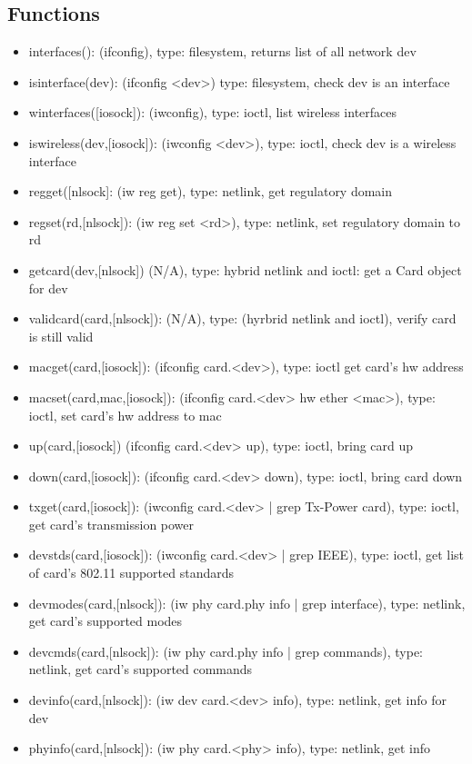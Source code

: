 \documentclass[11pt]{article}
\begin{document}
\begin{appendices}
\subsection{Functions}
\begin{itemize}
\item interfaces(): (ifconfig), type: filesystem, returns list of all network dev
\item isinterface(dev): (ifconfig <dev>) type: filesystem, check dev is an interface
\item winterfaces([iosock]): (iwconfig), type: ioctl, list wireless interfaces
\item iswireless(dev,[iosock]): (iwconfig <dev>), type: ioctl, check dev is a 
wireless interface
\item regget([nlsock]: (iw reg get), type: netlink, get regulatory domain
\item regset(rd,[nlsock]): (iw reg set <rd>), type: netlink, set regulatory domain 
to rd
\item getcard(dev,[nlsock]) (N/A), type: hybrid netlink and ioctl: get a Card 
object for dev
\item validcard(card,[nlsock]): (N/A), type: (hyrbrid netlink and ioctl), verify
card is still valid
\item macget(card,[iosock]): (ifconfig card.<dev>), type: ioctl get card's hw
address
\item macset(card,mac,[iosock]): (ifconfig card.<dev> hw ether <mac>), type: 
ioctl, set card's hw address to mac
\item up(card,[iosock]) (ifconfig card.<dev> up), type: ioctl, bring card up
\item down(card,[iosock]): (ifconfig card.<dev> down), type: ioctl, bring card 
down
\item txget(card,[iosock]): (iwconfig card.<dev> | grep Tx-Power card), type: 
ioctl, get card's transmission power
\item devstds(card,[iosock]): (iwconfig card.<dev> | grep IEEE), type: ioctl, get
list of card's 802.11 supported standards
\item devmodes(card,[nlsock]): (iw phy card.phy info | grep interface), type:
netlink, get card's supported modes
\item devcmds(card,[nlsock]): (iw phy card.phy info | grep commands), type:
netlink, get card's supported commands
\item devinfo(card,[nlsock]): (iw dev card.<dev> info), type: netlink, get info 
for dev 
\item phyinfo(card,[nlsock]): (iw phy card.<phy> info), type: netlink, get info

\end{itemize}
\end{appendices}
\end{document}
